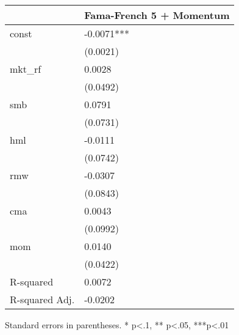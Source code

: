 \begin{table}
\caption{}
\label{}
\begin{center}
\begin{tabular}{ll}
\hline
               & Fama-French 5 + Momentum  \\
\hline
const          & -0.0071***                \\
               & (0.0021)                  \\
mkt\_rf        & 0.0028                    \\
               & (0.0492)                  \\
smb            & 0.0791                    \\
               & (0.0731)                  \\
hml            & -0.0111                   \\
               & (0.0742)                  \\
rmw            & -0.0307                   \\
               & (0.0843)                  \\
cma            & 0.0043                    \\
               & (0.0992)                  \\
mom            & 0.0140                    \\
               & (0.0422)                  \\
R-squared      & 0.0072                    \\
R-squared Adj. & -0.0202                   \\
\hline
\end{tabular}
\end{center}
\end{table}
\bigskip
Standard errors in parentheses. \newline 
* p<.1, ** p<.05, ***p<.01